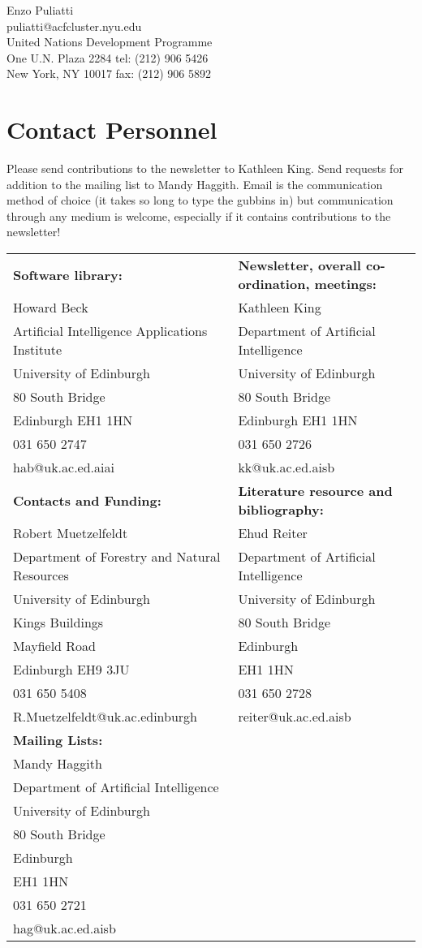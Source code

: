 Enzo Puliatti\\
puliatti@acfcluster.nyu.edu\\
United Nations Development Programme\\
One U.N. Plaza 2284                     tel: (212) 906 5426\\
New York, NY 10017                       fax: (212) 906 5892


\section{Contact Personnel}
Please send contributions to the newsletter to Kathleen King. Send
requests for addition to the mailing list to Mandy Haggith. Email is
the communication method of choice 
(it takes so long to type the gubbins in) but communication through any
medium is welcome, especially if it contains contributions to the
newsletter!

\begin{tabular}{l|l}
{\bf Software library:} & {\bf Newsletter, overall co-ordination,
meetings:}\\ 
Howard Beck &  Kathleen King\\
Artificial Intelligence Applications Institute &  Department of
Artificial Intelligence \\
University of Edinburgh & University of Edinburgh\\
80 South Bridge & 80 South Bridge\\
Edinburgh EH1 1HN & Edinburgh EH1 1HN\\
031 650 2747 & 031 650 2726\\
hab@uk.ac.ed.aiai & kk@uk.ac.ed.aisb\\
\hline
{\bf Contacts and Funding:} & {\bf Literature resource and bibliography:} \\ 
Robert Muetzelfeldt & Ehud Reiter\\
Department of Forestry and Natural Resources &   Department of Artificial Intelligence\\
University of Edinburgh & University of Edinburgh\\
Kings Buildings & 80 South Bridge\\
 Mayfield Road &  Edinburgh\\
Edinburgh   EH9 3JU & EH1 1HN\\
 031 650 5408 & 031 650 2728\\
 R.Muetzelfeldt@uk.ac.edinburgh & reiter@uk.ac.ed.aisb\\
\hline
{\bf Mailing Lists:} &\\ 
Mandy Haggith & \\
Department of Artificial Intelligence &\\
University of Edinburgh &\\
80 South Bridge &\\
Edinburgh &\\
EH1 1HN &\\
031 650 2721\\
hag@uk.ac.ed.aisb &\\
\hline

\end{tabular}






